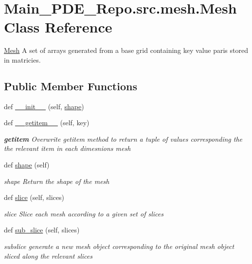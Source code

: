 \hypertarget{classMain__PDE__Repo_1_1src_1_1mesh_1_1Mesh}{}\section{Main\+\_\+\+P\+D\+E\+\_\+\+Repo.\+src.\+mesh.\+Mesh Class Reference}
\label{classMain__PDE__Repo_1_1src_1_1mesh_1_1Mesh}


\hyperlink{classMain__PDE__Repo_1_1src_1_1mesh_1_1Mesh}{Mesh} A set of arrays generated from a base grid containing key value paris stored in matricies.  


\subsection*{Public Member Functions}
\begin{DoxyCompactItemize}
\item 
def \hyperlink{classMain__PDE__Repo_1_1src_1_1mesh_1_1Mesh_a6b6acfdda769157a8d3b762b8e60106e}{\+\_\+\+\_\+init\+\_\+\+\_\+} (self, \hyperlink{classMain__PDE__Repo_1_1src_1_1mesh_1_1Mesh_a6f83620aa1c76185e2b81412957a4758}{shape})
\item 
def \hyperlink{classMain__PDE__Repo_1_1src_1_1mesh_1_1Mesh_ab5af22f5310645d40c4ce2e420b1b21e}{\+\_\+\+\_\+getitem\+\_\+\+\_\+} (self, key)
\begin{DoxyCompactList}\small\item\em {\bfseries getitem} Overwrite getitem method to return a tuple of values corresponding the the relevant item in each dimesnion\textquotesingle{}s mesh \end{DoxyCompactList}\item 
def \hyperlink{classMain__PDE__Repo_1_1src_1_1mesh_1_1Mesh_a6f83620aa1c76185e2b81412957a4758}{shape} (self)
\begin{DoxyCompactList}\small\item\em shape Return the shape of the mesh \end{DoxyCompactList}\item 
def \hyperlink{classMain__PDE__Repo_1_1src_1_1mesh_1_1Mesh_afcb5da499b85e096c5ab20bbf11ad1c6}{slice} (self, slices)
\begin{DoxyCompactList}\small\item\em slice Slice each mesh according to a given set of slices \end{DoxyCompactList}\item 
def \hyperlink{classMain__PDE__Repo_1_1src_1_1mesh_1_1Mesh_adfbc08946443424b523a771ca67a7009}{sub\+\_\+slice} (self, slices)
\begin{DoxyCompactList}\small\item\em subslice generate a new mesh object corresponding to the original mesh object sliced along the relevant slices \end{DoxyCompactList}\end{DoxyCompactItemize}
